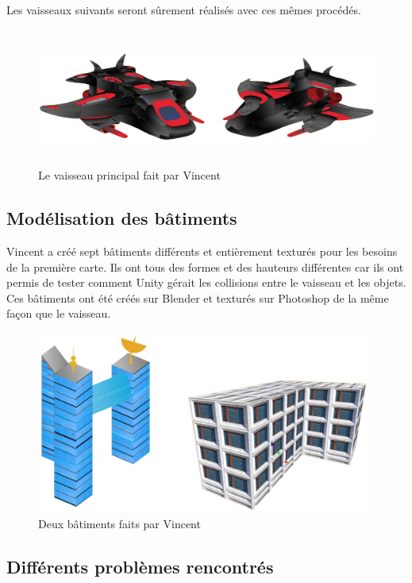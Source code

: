 \documentclass[10pt, titlepage]{report}
\begin{document}
Les vaisseaux suivants seront sûrement réalisés avec ces mêmes procédés.

\begin{figure}
\center
\includegraphics[height=4.5cm, width=15cm]{vaisseau_vincent.jpg}
\caption{Le vaisseau principal fait par Vincent}
\end{figure}

\subsection{Modélisation des bâtiments}

Vincent a créé sept bâtiments différents et entièrement texturés pour les besoins de la première carte. Ils ont tous des formes et des hauteurs différentes car ils ont permis de tester comment Unity gérait les collisions entre le vaisseau et les objets.\\

Ces bâtiments ont été créés sur Blender et texturés sur Photoshop de la même façon que le vaisseau.

\begin{figure}
\center
\includegraphics[height=6cm, width=11cm]{batiments_vincent.jpg}
\caption{Deux bâtiments faits par Vincent}
\end{figure}

\subsection{Différents problèmes rencontrés}
\end{document}
